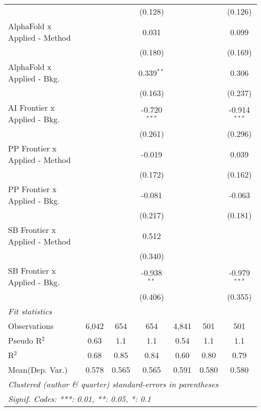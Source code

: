 \begin{tabular}{lcccccc}
                                  &         &              & (0.128)        &         &               & (0.126)\\   
   AlphaFold x Applied - Method   &         &              & 0.031          &         &               & 0.099\\   
                                  &         &              & (0.180)        &         &               & (0.169)\\   
   AlphaFold x Applied - Bkg.     &         &              & 0.339$^{**}$   &         &               & 0.306\\   
                                  &         &              & (0.163)        &         &               & (0.237)\\   
   AI Frontier x Applied - Bkg.   &         &              & -0.720$^{***}$ &         &               & -0.914$^{***}$\\   
                                  &         &              & (0.261)        &         &               & (0.296)\\   
   PP Frontier x Applied - Method &         &              & -0.019         &         &               & 0.039\\   
                                  &         &              & (0.172)        &         &               & (0.162)\\   
   PP Frontier x Applied - Bkg.   &         &              & -0.081         &         &               & -0.063\\   
                                  &         &              & (0.217)        &         &               & (0.181)\\   
   SB Frontier x Applied - Method &         &              & 0.512          &         &               &   \\   
                                  &         &              & (0.340)        &         &               &   \\   
   SB Frontier x Applied - Bkg.   &         &              & -0.938$^{**}$  &         &               & -0.979$^{***}$\\   
                                  &         &              & (0.406)        &         &               & (0.355)\\   
   \midrule
   \emph{Fit statistics}\\
   Observations                   & 6,042   & 654          & 654            & 4,841   & 501           & 501\\  
   Pseudo R$^2$                   & 0.63    & 1.1          & 1.1            & 0.54    & 1.1           & 1.1\\  
   R$^2$                          & 0.68    & 0.85         & 0.84           & 0.60    & 0.80          & 0.79\\  
Mean(Dep. Var.) & 0.578 & 0.565 & 0.565 & 0.591 & 0.580 & 0.580 \\
   \midrule \midrule
   \multicolumn{7}{l}{\emph{Clustered (author \& quarter) standard-errors in parentheses}}\\
   \multicolumn{7}{l}{\emph{Signif. Codes: ***: 0.01, **: 0.05, *: 0.1}}\\
\end{tabular}
\par\endgroup
